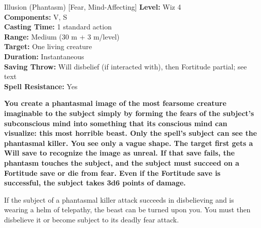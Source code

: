 {Illusion (Phantasm) [Fear, Mind-Affecting]}
{
	\textbf{Level:}
	Wiz 4\\
	\textbf{Components:}
	V, S\\
	\textbf{Casting Time:}
	1 standard action\\
	\textbf{Range:}
	Medium (30 m + 3 m/level)\\
	\textbf{Target:}
	One living creature\\
	\textbf{Duration:}
	Instantaneous\\
	\textbf{Saving Throw:}
	Will disbelief (if interacted with), then Fortitude partial; see text\\
	\textbf{Spell Resistance:}
	Yes\\
}
{
	\textbf{	You create a phantasmal image of the most fearsome creature imaginable to the subject simply by forming the fears of the subject's subconscious mind into something that its conscious mind can visualize: this most horrible beast. Only the spell's subject can see the phantasmal killer. You see only a vague shape. The target first gets a Will save to recognize the image as unreal. If that save fails, the phantasm touches the subject, and the subject must succeed on a Fortitude save or die from fear. Even if the Fortitude save is successful, the subject takes 3d6 points of damage.}

	If the subject of a phantasmal killer attack succeeds in disbelieving and is wearing a helm of telepathy, the beast can be turned upon you. You must then disbelieve it or become subject to its deadly fear attack.

}
